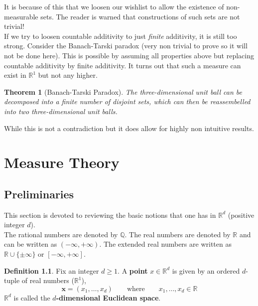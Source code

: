 \documentclass[a4paper, 11pt]{book}
\newtheorem{theorem}{Theorem}
\theoremstyle{definition}
\newtheorem{definition}{Definition}[section]
\theoremstyle{remark}
\begin{document}
   It is because of this that we loosen our wishlist to allow the existence of non-measurable sets. The reader is warned
   that constructions of such sets are not trivial!\\

   If we try to loosen countable additivity to just \textit{finite} additivity, it is still too strong. Consider the Banach-Tarski
   paradox (very non trivial to prove so it will not be done here). This is possible by assuming all properties above but replacing
   countable additivity by finite additivity. It turns out that such a measure can exist in $\mathbb{R}^1$ but not any higher.

   \begin{theorem}[Banach-Tarski Paradox]
       The three-dimensional unit ball can be decomposed into a finite number of disjoint sets, which can then be reassembelled
       into two three-dimensional unit balls.
   \end{theorem}

    While this is not a contradiction but it does allow for highly non intuitive results.

    \chapter{Measure Theory}

    \section{Preliminaries}

    This section is devoted to reviewing the basic notions that one has in $\mathbb{R}^d$ (positive integer $d$).\\

    The rational numbers are denoted by $\mathbb{Q}$. The real numbers are denoted by $\mathbb{R}$ and can be written as
    $(-\infty,+\infty)$. The extended real numbers are written as $\mathbb{R}\cup\{\pm \infty\}$ or $[-\infty,+\infty]$.\\

    \begin{definition}
        Fix an integer $d\geq 1$. A \textbf{point} $x\in\mathbb{R}^d$ is given by an ordered $d$-tuple of real numbers 
        ($\mathbb{R}^1$),
        \[ \mathbf{x} = (x_1,\hdots,x_d)\qquad\text{where}\qquad x_1,\hdots,x_d\in\mathbb{R} \]
        $\mathbb{R}^d$ is called the \textbf{$d$-dimensional Euclidean space}.
    \end{definition}
\end{document}
